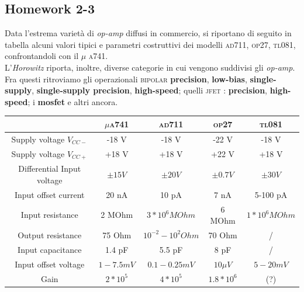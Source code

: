 \documentclass[journal, a4paper]{IEEEtran}
\begin{document}
\subsection{Homework 2-3}

Data l'estrema varietà di \textit{op-amp} diffusi in commercio, si riportano di seguito in tabella alcuni valori tipici e parametri costruttivi dei modelli \textsc{ad711, op27, tl081}, confrontandoli con il \textsc{$\mu$ a741}.\\

L'\textit{Horowitz} riporta, inoltre, diverse categorie in cui vengono suddivisi gli \textit{op-amp}. Fra questi ritroviamo gli operazionali \textsc{bipolar} \textbf{precision}, \textbf{low-bias}, \textbf{single-supply}, \textbf{single-supply precision}, \textbf{high-speed}; quelli \textsc{jfet} : \textbf{precision}, \textbf{high-speed}; i \textbf{mosfet} e altri ancora.\\


\begin{tabular}{|c|c|c|c|c|}
\hline  & \textbf{\textsc{ $\mu $a741}} & \textbf{\textsc{ad711}} & \textbf{\textsc{op27}} & \textbf{\textsc{tl081}} \\ 
\hline Supply voltage $V_{CC-}$ & -18 V & -18 V & -22 V & -18 V \\ 
\hline Supply voltage $V_{CC+}$ & +18 V & +18 V & +22 V & +18 V \\ 
\hline Differential Input voltage & $ \pm 15 \si{V}$ &$ \pm 20 \si{V}$ & $\pm 0.7 \si{V}$ & $\pm 30 \si{V}$ \\ 
\hline Input offset current & 20 nA & 10 pA & 7 nA & 5-100 pA \\ 
\hline Input resistance & 2 \si{MOhm} & $3*10^6 \si{MOhm} $ & 6 \si{MOhm} & $1*10^6 \si{MOhm}$ \\ 
\hline Output resistance & 75 \si{Ohm} & $10^{-2}-10^2  \si{Ohm} $& 70 \si{Ohm} & / \\ 
\hline Input capacitance & 1.4 \si{pF} & 5.5 \si{pF} & 8 \si{pF} & / \\ 
\hline Input offset voltage & $1-7.5 \si{mV}$ & $0.1-0.25 \si{mV} $ & $10 \mu\si{V} $ & $5-20 \si{mV} $ \\
\hline Gain & $2*10^5$ & $4*10^5$ & $1.8*10^6 $ & (?) \\
 
\hline 
\end{tabular} 
\end{document}
